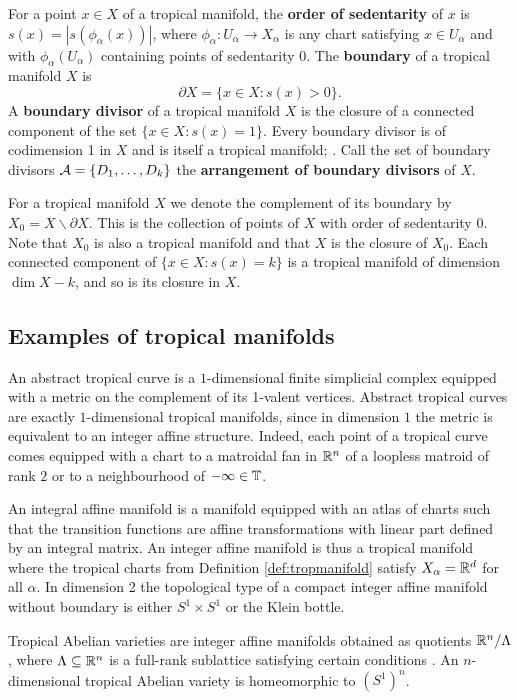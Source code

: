 \begin{defi}
For a point $x \in  X$ of a tropical manifold, the {\bf order of sedentarity} of $x$ is $s(x) = |s(\phi_{\alpha}(x))|$, where $\phi_{\alpha}: U_{\alpha} \to  X_{\alpha}$ is any  chart satisfying $x \in U_{\alpha}$ and with $\phi_{\alpha}(U_{\alpha})$ containing points of sedentarity $0$.
The {\bf boundary} of a tropical manifold $X$ is $$\partial X = \{ x \in X : s(x) > 0 \}.$$ 
A {\bf boundary divisor} of a tropical manifold $X$ is 
the closure of a connected component of the set $\{ x \in X : s(x) = 1\}$. 
Every boundary divisor is of codimension 1 in $X$ and is itself a tropical manifold; \cite[Proposition 1.2.8]{Shaw:Surf}. Call the set of boundary divisors ${\mathcal A} = \{ D_1, \dots, D_k\}$ the \textbf{arrangement of boundary divisors} of $X$. 
\end{defi}

For a tropical manifold $X$ we denote the complement of its boundary by $X_0 = X \backslash \partial X$. This is the collection of points of $X$ with order of sedentarity  $0$.
Note that $X_0$ is also a tropical manifold and that $X$ is the closure of $X_0$. 
Each connected component of $\{ x \in X : s(x) = k\}$ is a tropical manifold of dimension $\dim X - k$, and so is its closure in $X$. 




\subsection{Examples of tropical manifolds}
\label{sec:examples}


\begin{exa} An abstract tropical curve is a  $1$-dimensional finite simplicial complex equipped with a metric on the complement of its 1-valent vertices. Abstract tropical curves are exactly $1$-dimensional tropical manifolds, since in dimension $1$ the metric is equivalent to an integer affine structure. Indeed, each point of a tropical curve comes equipped with a chart to a matroidal fan in $\mathbb{R}^n$ of a loopless matroid of rank $2$ or to a neighbourhood of $-\infty \in \mathbb{T}$.
\end{exa}

\begin{exa}
An integral affine manifold is a manifold equipped with an atlas of charts such that the transition functions are affine transformations with linear part defined by an integral matrix. 
An integer affine manifold is thus a tropical manifold where the tropical charts from Definition \ref{def:tropmanifold} satisfy $X_{\alpha} = \mathbb{R}^d$ for all $\alpha$. In dimension 2 the topological  type of a compact integer affine manifold without boundary is either $S^1 \times S^1$ or the Klein bottle. 

Tropical Abelian varieties are integer affine manifolds obtained as quotients  $\mathbb{R}^n / \Lambda$, where $\Lambda \subseteq \mathbb{R}^n$ is a full-rank sublattice satisfying certain conditions \cite{MikZha:Jac}.  An $n$-dimensional tropical Abelian variety is homeomorphic to $(S^1)^n$. 
\end{exa}


